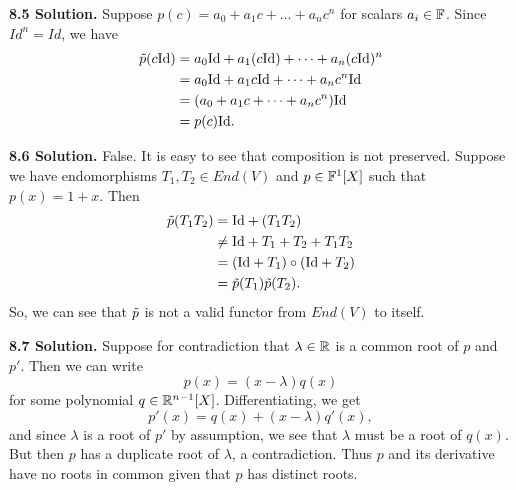 \textbf{8.5 Solution.} Suppose $p(c) = a_0 + a_1c + \dots + a_nc^n$ for scalars $a_i \in \mathbb{F}$. Since $Id^n = Id$, we have
\begin{align*}
    \Tilde{p}(c\text{Id}) &= a_0\text{Id} + a_1(c\text{Id}) + \dots + a_n(c\text{Id})^n \\
    &= a_0\text{Id} + a_1c\text{Id} + \dots + a_nc^n\text{Id} \\
    &= (a_0 + a_1c + \dots + a_nc^n)\text{Id} \\
    &= p(c)\text{Id}.
\end{align*}

\textbf{8.6 Solution.} False. It is easy to see that composition is not preserved. Suppose we have endomorphisms $T_1, T_2 \in End(V)$ and $p \in \mathbb{F}^1[X]$ such that $p(x) = 1 + x$. Then 
\begin{align*}
    \Tilde{p}(T_1T_2) &= \text{Id} + (T_1T_2) \\
    &\neq \text{Id} + T_1 + T_2 + T_1T_2 \\
    &= (\text{Id} + T_1)\circ(\text{Id} + T_2) \\
    &= \Tilde{p}(T_1)\Tilde{p}(T_2).
\end{align*}
So, we can see that $\Tilde{p}$ is not a valid functor from $End(V)$ to itself.

\textbf{8.7 Solution.} Suppose for contradiction that $\lambda \in \mathbb{R}$ is a common root of $p$ and $p'$. Then we can write 
\[
p(x) = (x - \lambda)q(x)
\]
for some polynomial $q \in \mathbb{R}^{n-1}[X]$. Differentiating, we get 
\[
p'(x) = q(x) + (x - \lambda)q'(x),
\]
and since $\lambda$ is a root of $p'$ by assumption, we see that $\lambda$ must be a root of $q(x)$. But then $p$ has a duplicate root of $\lambda$, a contradiction. Thus $p$ and its derivative have no roots in common given that $p$ has distinct roots.
